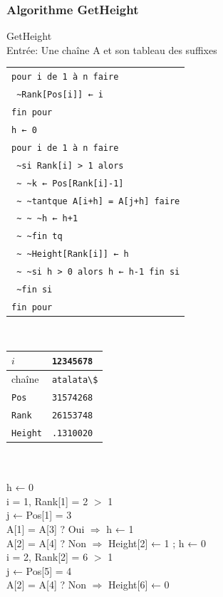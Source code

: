 \documentclass[10pt]{beamer}
\begin{document}
\begin{frame}
  \frametitle{Algorithme GetHeight}
  \scriptsize
  \begin{multicols}{2}
GetHeight\\
Entrée: Une chaîne A et son tableau des suffixes\\
\begin{tabular}{|l}
  \verb!pour i de 1 à n faire!\\
  \verb! ~Rank[Pos[i]] ← i!\\
  \verb!fin pour!\\
  \verb!h ← 0!\\
  \verb!pour i de 1 à n faire!\\
  \verb! ~si Rank[i] > 1 alors!\\
  \verb! ~ ~k ← Pos[Rank[i]-1]!\\
  \verb! ~ ~tantque A[i+h] = A[j+h] faire!\\
  \verb! ~ ~ ~h ← h+1!\\
  \verb! ~ ~fin tq!\\
  \verb! ~ ~Height[Rank[i]] ← h!\\
  \verb! ~ ~si h > 0 alors h ← h-1 fin si!\\
  \verb! ~fin si!\\
  \verb!fin pour!\\
\end{tabular}\\
  \columnbreak
  \begin{tabular}{ll}
    $i$      & \verb!12345678!\\
    \hline
    chaîne & \verb!atalata\$!\\
    \texttt{Pos}    & \texttt{31574268}\\
    \texttt{Rank}   & \texttt{26153748}\\
    \texttt{Height} & \texttt{.1310020}\\
  \end{tabular}\\
  \hfill \\
  h ← 0\\
  i = 1, Rank[1] = 2 $>$ 1\\
         j ← Pos[1] = 3\\
           A[1] = A[3] ? Oui $\Rightarrow$ h ← 1\\
           A[2] = A[4] ? Non $\Rightarrow$ Height[2] ← 1 ; h ← 0\\
  \pause
  i = 2, Rank[2] = 6 $>$ 1\\
         j ← Pos[5] = 4\\
           A[2] = A[4] ? Non $\Rightarrow$ Height[6] ← 0\\

\end{multicols}
\end{frame}
\end{document}
